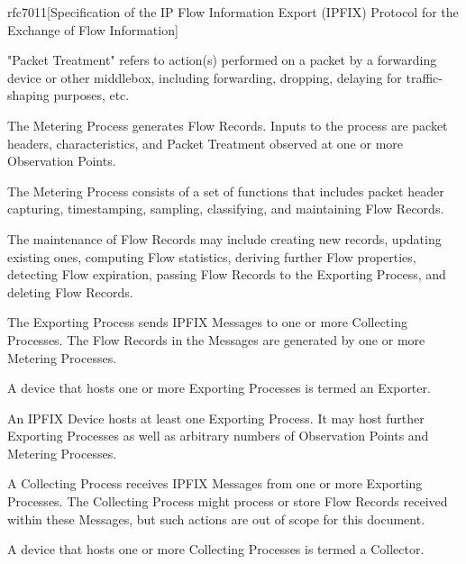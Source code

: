 \begin{displaycquote}{rfc7011}[Specification of the IP Flow Information Export (IPFIX) Protocol for the Exchange of Flow Information]
\begin{description}[style=nextline]
		\item[Packet Treatment]
      "Packet Treatment" refers to action(s) performed on a packet by a
      forwarding device or other middlebox, including forwarding,
      dropping, delaying for traffic-shaping purposes, etc.

		\item[Metering Process] 

      The Metering Process generates Flow Records.  Inputs to the
      process are packet headers, characteristics, and Packet Treatment
      observed at one or more Observation Points.

      The Metering Process consists of a set of functions that includes
      packet header capturing, timestamping, sampling, classifying, and
      maintaining Flow Records.

      The maintenance of Flow Records may include creating new records,
      updating existing ones, computing Flow statistics, deriving
      further Flow properties, detecting Flow expiration, passing Flow
      Records to the Exporting Process, and deleting Flow Records.
      
		\item[Exporting Process]
      The Exporting Process sends IPFIX Messages to one or more
      Collecting Processes.  The Flow Records in the Messages are
      generated by one or more Metering Processes.

		\item[Exporter]
      A device that hosts one or more Exporting Processes is termed an
      Exporter.

		\item[IPFIX Device]
      An IPFIX Device hosts at least one Exporting Process.  It may host
      further Exporting Processes as well as arbitrary numbers of
      Observation Points and Metering Processes.

		\item[Collecting Process]
      A Collecting Process receives IPFIX Messages from one or more
      Exporting Processes.  The Collecting Process might process or
      store Flow Records received within these Messages, but such
      actions are out of scope for this document.

		\item[Collector]
      A device that hosts one or more Collecting Processes is termed a
      Collector.
    \end{description}

\end{displaycquote}


